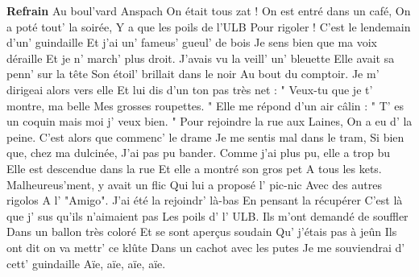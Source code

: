 \footnotemark [ititle={Boulevard Anspach, Le}, tu={Les Champs-Élysées (Joe Dassin)}]


\beginchorus
\textbf{Refrain}
Au boul'vard Anspach
On était tous zat !
On est entré dans un café,
On a poté tout' la soirée,
Y a que les poils de l'ULB
Pour rigoler !
\endchorus
\beginverse
C'est le lendemain d'un' guindaille
Et j'ai un' fameus' gueul' de bois
Je sens bien que ma voix déraille
Et je n' march' plus droit.
J'avais vu la veill' un' bleuette
Elle avait sa penn' sur la tête
Son étoil' brillait dans le noir
Au bout du comptoir.
\endverse
\beginverse
Je m' dirigeai alors vers elle
Et lui dis d'un ton pas très net :
" Veux-tu que je t' montre, ma belle
Mes grosses roupettes. "
Elle me répond d'un air câlin :
" T' es un coquin mais moi j' veux bien. "
Pour rejoindre la rue aux Laines,
On a eu d' la peine.
\endverse
\beginverse
C'est alors que commenc' le drame
Je me sentis mal dans le tram,
Si bien que, chez ma dulcinée,
J'ai pas pu bander.
Comme j'ai plus pu, elle a trop bu
Elle est descendue dans la rue
Et elle a montré son gros pet
A tous les kets.
\endverse
\beginverse
Malheureus'ment, y avait un flic
Qui lui a proposé l' pic-nic
Avec des autres rigolos
A l' "Amigo".
J'ai été la rejoindr' là-bas
En pensant la récupérer
C'est là que j' sus qu'ils n'aimaient pas
Les poils d' l' ULB.
\endverse
\beginverse
Ils m'ont demandé de souffler
Dans un ballon très coloré
Et se sont aperçus soudain
Qu' j'étais pas à jeûn
Ils ont dit on va mettr' ce klûte
Dans un cachot avec les putes
Je me souviendrai d' cett' guindaille
Aïe, aïe, aïe, aïe.
\endverse
\endsong

